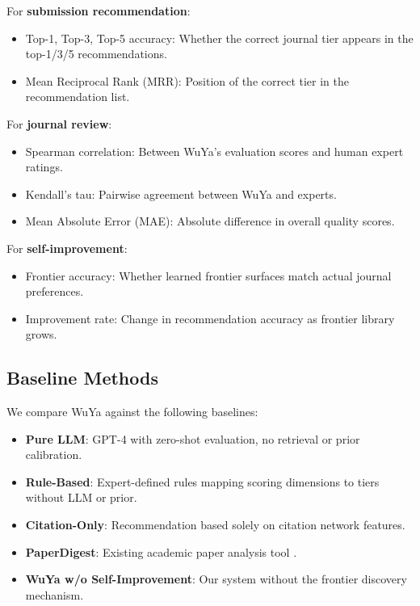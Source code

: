 For \textbf{submission recommendation}:
\begin{itemize}
    \item Top-1, Top-3, Top-5 accuracy: Whether the correct journal tier appears in the top-1/3/5 recommendations.
    \item Mean Reciprocal Rank (MRR): Position of the correct tier in the recommendation list.
\end{itemize}

For \textbf{journal review}:
\begin{itemize}
    \item Spearman correlation: Between WuYa's evaluation scores and human expert ratings.
    \item Kendall's tau: Pairwise agreement between WuYa and experts.
    \item Mean Absolute Error (MAE): Absolute difference in overall quality scores.
\end{itemize}

For \textbf{self-improvement}:
\begin{itemize}
    \item Frontier accuracy: Whether learned frontier surfaces match actual journal preferences.
    \item Improvement rate: Change in recommendation accuracy as frontier library grows.
\end{itemize}

\subsection{Baseline Methods}

We compare WuYa against the following baselines:

\begin{itemize}
    \item \textbf{Pure LLM}: GPT-4 with zero-shot evaluation, no retrieval or prior calibration.
    \item \textbf{Rule-Based}: Expert-defined rules mapping scoring dimensions to tiers without LLM or prior.
    \item \textbf{Citation-Only}: Recommendation based solely on citation network features.
    \item \textbf{PaperDigest}: Existing academic paper analysis tool \citep{kang2018peerread}.
    \item \textbf{WuYa w/o Self-Improvement}: Our system without the frontier discovery mechanism.
\end{itemize}

